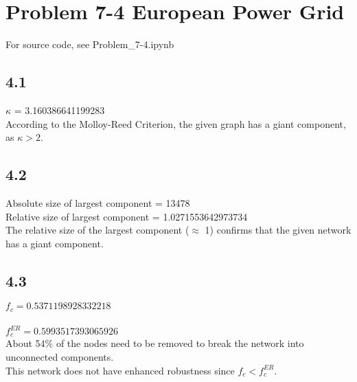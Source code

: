 \documentclass[../document.tex]{subfiles}
\begin{document}
\section*{Problem 7-4  European Power Grid}
For source code, see Problem\_7-4.ipynb
\subsection*{4.1}
$ \kappa$ = 3.160386641199283 \\
According to the Molloy-Reed Criterion, the given graph has a giant component, as $\kappa > 2$. 

\subsection*{4.2}

Absolute size of largest component = 13478\\
Relative size of largest component = 1.0271553642973734\\

The relative size of the largest component ($\approx$ 1) confirms that the given network has a giant component.

\subsection*{4.3}
$f_c     = 0.5371198928332218$\\
\\
$f_c^{ER} = 0.5993517393065926$\\

About 54\% of the nodes need to be removed to break the network into unconnected components.\\
This network does not have enhanced robustness since $f_c < f_c^{ER}$.
\end{document}
